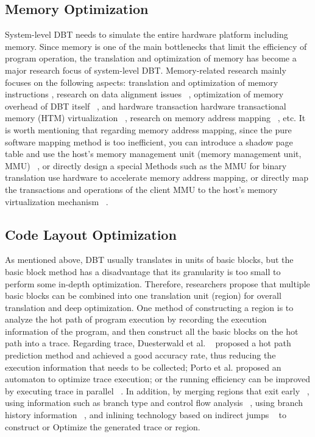 \subsection{Memory Optimization}
System-level DBT needs to simulate the entire hardware platform including memory.
Since memory is one of the main bottlenecks that limit the efficiency of program operation, the translation and optimization of memory has become a major research focus of system-level DBT.
Memory-related research mainly focuses on the following aspects: translation and optimization of memory instructions \cite{Xu2007MetadataDM}, research on data alignment issues ~\cite{Li2009AnEO}\cite{Li2011EfficientAE}, optimization of memory overhead of DBT itself ~\cite{Guha2012MemoryOO}, and hardware transaction hardware transactional memory (HTM) virtualization ~\cite{Wang2020EfficientAS}, research on memory address mapping ~\cite{Chang2014EfficientMV}\cite{Huang2021BTMMUAE}, etc.
It is worth mentioning that regarding memory address mapping, since the pure software mapping method is too inefficient, you can introduce a shadow page table and use the host's memory management unit (memory management unit, MMU) ~\cite{Chang2014EfficientMV}, or directly design a special Methods such as the MMU \cite{Huang2021BTMMUAE} for binary translation use hardware to accelerate memory address mapping, or directly map the transactions and operations of the client MMU to the host's memory virtualization mechanism ~\cite{Spink2016HardwareAcceleratedCF}.

\subsection{Code Layout Optimization}
As mentioned above, DBT usually translates in units of basic blocks, but the basic block method has a disadvantage that its granularity is too small to perform some in-depth optimization.
Therefore, researchers propose that multiple basic blocks can be combined into one translation unit (region) for overall translation and deep optimization.
One method of constructing a region is to analyze the hot path of program execution by recording the execution information of the program, and then construct all the basic blocks on the hot path into a trace.
Regarding trace, Duesterwald et al. ~\cite{Duesterwald2000SoftwarePF} proposed a hot path prediction method and achieved a good accuracy rate, thus reducing the execution information that needs to be collected; Porto et al. \cite{Porto2010TraceEA} proposed an automaton to optimize trace execution; or the running efficiency can be improved by executing trace in parallel ~\cite{Bhm2011GeneralizedJT}.
In addition, by merging regions that exit early ~\cite{Hsu2013ImprovingDB}, using information such as branch type and control flow analysis ~\cite{Spink2014EfficientCG}, using branch history information ~\cite{Hong2018ProcessorTracingGR}, and inlining technology based on indirect jumps ~\cite{Callaghan2020OptimisingDB} to construct or Optimize the generated trace or region.

